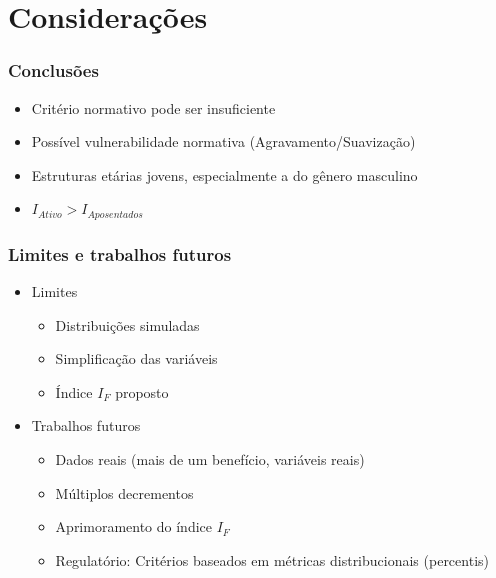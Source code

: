 \documentclass[11pt]{beamer}
\begin{document}
\section{Considerações}
    \begin{frame}
        \frametitle{Conclusões}
            \begin{itemize}
                \item Critério normativo pode ser insuficiente
                \item Possível vulnerabilidade normativa (Agravamento/Suavização)
                \item Estruturas etárias jovens, especialmente a do gênero masculino
                \item $I_{Ativo} > I_{Aposentados}$
            \end{itemize}
            
    \end{frame}

    \begin{frame}
        \frametitle{Limites e trabalhos futuros}
            \begin{itemize}
                \item[] Limites
                \begin{itemize}
                    \medskip
                    \item Distribuições simuladas
                    \medskip
                    \item Simplificação das variáveis
                    \medskip
                    \item Índice $I_F$ proposto
                \end{itemize}
                \medskip
                \item[] Trabalhos futuros
                \begin{itemize}
                    \medskip
                    \item Dados reais (mais de um benefício, variáveis reais)
                    \medskip
                    \item Múltiplos decrementos
                    \medskip
                    \item Aprimoramento do índice $I_F$
                    \medskip
                    \item Regulatório: Critérios baseados em métricas distribucionais (percentis)
                \end{itemize}
            \end{itemize}
            
    \end{frame}
\end{document}
